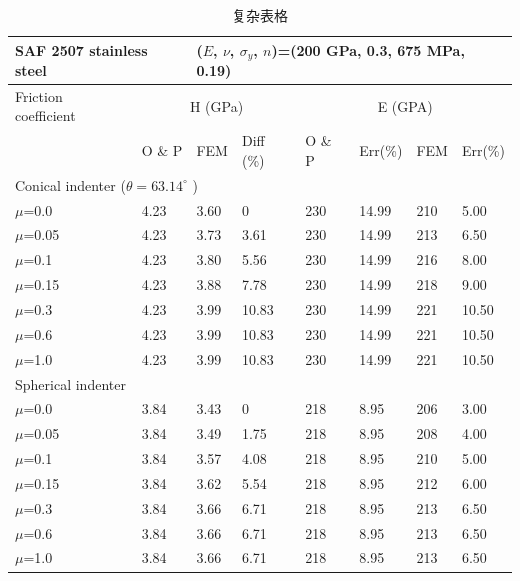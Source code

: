 \documentclass[fancyhdr,adobefonts,oneside,hyperref,openany,a4paper,UTF8]{ctexbook}
\begin{document}
\begin{table}[htp]
   \begin{center}
   \caption{\label{tab:complicate}复杂表格}
\begin{tabular}{l l l l l l l l }

\hline
\multicolumn{2}{l}{SAF 2507 stainless steel} & \multicolumn{6}{l}{($E$, $\nu$, $\sigma_y$, $n$)=(200 GPa, 0.3, 675 MPa, 0.19) } \\
\hline
  Friction coefficient
  & \multicolumn{3}{c}{H (GPa)} & \multicolumn{4}{c}{E (GPA) } \\
  \cline{2-8}
   & {O \& P} & {FEM} & {Diff (\%)} & {O \& P} & {Err(\%)} & {FEM} & {Err(\%)}  \\
  \cline{2-8}
\multicolumn{8}{l}{Conical indenter ($\theta =63.14^\circ $ )} \\
  $\mu$=0.0  & 4.23 & 3.60 & 0     & 230 & 14.99 & 210 & 5.00   \\
  $\mu$=0.05 & 4.23 & 3.73 & 3.61  & 230 & 14.99 & 213 & 6.50 \\
  $\mu$=0.1  & 4.23 & 3.80 & 5.56  & 230 & 14.99 & 216 & 8.00 \\
  $\mu$=0.15 & 4.23 & 3.88 & 7.78  & 230 & 14.99 & 218 & 9.00 \\
  $\mu$=0.3  & 4.23 & 3.99 & 10.83 & 230 & 14.99 & 221 & 10.50 \\
  $\mu$=0.6  & 4.23 & 3.99 & 10.83 & 230 & 14.99 & 221 & 10.50 \\
  $\mu$=1.0  & 4.23 & 3.99 & 10.83 & 230 & 14.99 & 221 & 10.50 \\
\hline
\multicolumn{8}{l}{Spherical indenter} \\
   $\mu$=0.0  & 3.84 & 3.43 & 0    & 218 & 8.95 & 206 & 3.00 \\
   $\mu$=0.05 & 3.84 & 3.49 & 1.75 & 218 & 8.95 & 208 & 4.00 \\
   $\mu$=0.1  & 3.84 & 3.57 & 4.08 & 218 & 8.95 & 210 & 5.00 \\
   $\mu$=0.15 & 3.84 & 3.62 & 5.54 & 218 & 8.95 & 212 & 6.00 \\
   $\mu$=0.3  & 3.84 & 3.66 & 6.71 & 218 & 8.95 & 213 & 6.50 \\
   $\mu$=0.6  & 3.84 & 3.66 & 6.71 & 218 & 8.95 & 213 & 6.50 \\
   $\mu$=1.0  & 3.84 & 3.66 & 6.71 & 218 & 8.95 & 213 & 6.50 \\
\hline
\end{tabular}
\end{center}
\end{table}
\end{document}
